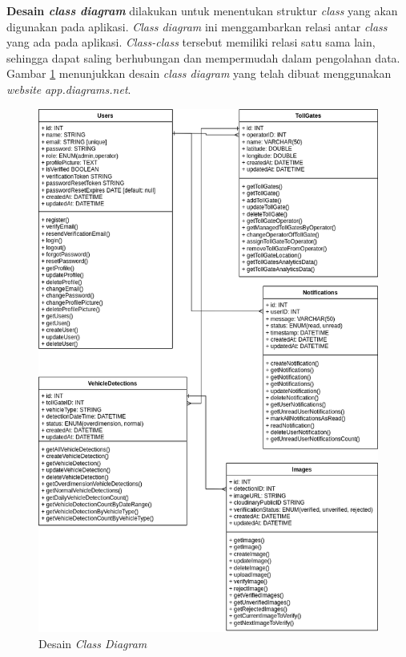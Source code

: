 \textbf{Desain \emph{class diagram}} dilakukan untuk menentukan struktur \emph{class} yang akan digunakan pada aplikasi. \emph{Class diagram} ini menggambarkan relasi antar \emph{class} yang ada pada aplikasi. \emph{Class-class} tersebut memiliki relasi satu sama lain, sehingga dapat saling berhubungan dan mempermudah dalam pengolahan data. Gambar \ref{fig:classdiagram} menunjukkan desain \emph{class diagram} yang telah dibuat menggunakan \emph{website} \emph{app.diagrams.net}.

\begin{figure}[htbp]
  \centering

  \includegraphics[scale=0.6]{gambar/bab3-class-diagram.png}

  \caption{Desain \emph{Class Diagram}}
  \label{fig:classdiagram}
\end{figure}
